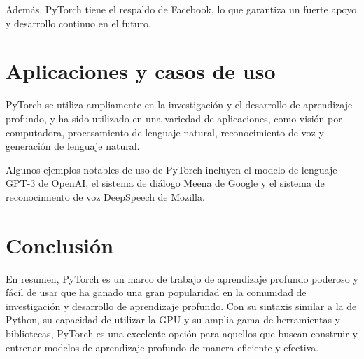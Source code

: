 \documentclass{article}
\begin{document}
Además, PyTorch tiene el respaldo de Facebook, lo que garantiza un fuerte apoyo y desarrollo continuo en el futuro.

\section{Aplicaciones y casos de uso}
PyTorch se utiliza ampliamente en la investigación y el desarrollo de aprendizaje profundo, y ha sido utilizado en una variedad de aplicaciones, como visión por computadora, procesamiento de lenguaje natural, reconocimiento de voz y generación de lenguaje natural.

Algunos ejemplos notables de uso de PyTorch incluyen el modelo de lenguaje GPT-3 de OpenAI, el sistema de diálogo Meena de Google y el sistema de reconocimiento de voz DeepSpeech de Mozilla.

\section{Conclusión}
En resumen, PyTorch es un marco de trabajo de aprendizaje profundo poderoso y fácil de usar que ha ganado una gran popularidad en la comunidad de investigación y desarrollo de aprendizaje profundo. Con su sintaxis similar a la de Python, su capacidad de utilizar la GPU y su amplia gama de herramientas y bibliotecas, PyTorch es una excelente opción para aquellos que buscan construir y entrenar modelos de aprendizaje profundo de manera eficiente y efectiva.
\end{document}
